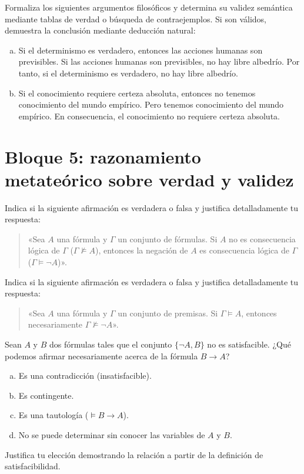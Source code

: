 \begin{pregunta}\label{e2-filo}
Formaliza los siguientes argumentos filosóficos y determina su validez semántica mediante tablas de verdad o búsqueda de contraejemplos. Si son válidos, demuestra la conclusión mediante deducción natural:
\begin{enumerate}[(a)]
    \item Si el determinismo es verdadero, entonces las acciones humanas son previsibles. Si las acciones humanas son previsibles, no hay libre albedrío. Por tanto, si el determinismo es verdadero, no hay libre albedrío.
    \item Si el conocimiento requiere certeza absoluta, entonces no tenemos conocimiento del mundo empírico. Pero tenemos conocimiento del mundo empírico. En consecuencia, el conocimiento no requiere certeza absoluta.
\end{enumerate}
\end{pregunta}

\section*{Bloque 5: razonamiento metateórico sobre verdad y validez}

\begin{pregunta}\label{e2-vf1}
Indica si la siguiente afirmación es verdadera o falsa y justifica detalladamente tu respuesta:
\begin{quote}
«Sea $A$ una fórmula y $\Gamma$ un conjunto de fórmulas. Si $A$ no es consecuencia lógica de $\Gamma$ ($\Gamma \not\models A$), entonces la negación de $A$ es consecuencia lógica de $\Gamma$ ($\Gamma \models \neg A$)».
\end{quote}
\end{pregunta}

\begin{pregunta}\label{e2-vf2}
Indica si la siguiente afirmación es verdadera o falsa y justifica detalladamente tu respuesta:
\begin{quote}
«Sea $A$ una fórmula y $\Gamma$ un conjunto de premisas. Si $\Gamma \models A$, entonces necesariamente $\Gamma \not\models \neg A$».
\end{quote}
\end{pregunta}

\begin{pregunta}\label{e2-insat}
Sean $A$ y $B$ dos fórmulas tales que el conjunto $\{\neg A, B\}$ no es satisfacible. ¿Qué podemos afirmar necesariamente acerca de la fórmula $B \to A$?
\begin{enumerate}[(a)]
    \item Es una contradicción (insatisfacible).
    \item Es contingente.
    \item Es una tautología ($\models B \to A$).
    \item No se puede determinar sin conocer las variables de $A$ y $B$.
\end{enumerate}
Justifica tu elección demostrando la relación a partir de la definición de satisfacibilidad.
\end{pregunta}

